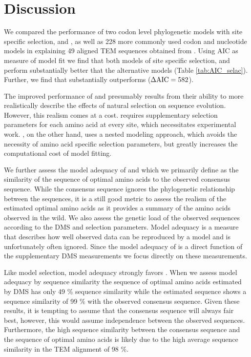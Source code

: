 \documentclass[12pt]{article}
\begin{document}
\section{Discussion}

We compared the performance of two codon level phylogenetic models with site specific selection, \phydms and \selac, as well as 228 more commonly used codon and nucleotide models in explaining 49 aligned TEM sequences obtained from \citet{bloom2017}.
Using AIC as measure of model fit we find that both models of site specific selection, \phydms and \selac perform substantially better that the alternative models (Table \ref{tab:AIC_selac}).
Further, we find that \selac substantially outperforms \phydms ($\Delta\text{AIC} = 582$).

The improved performance of \phydms and \selac presumably results from their ability to more realistically describe the effects of natural selection on sequence evolution.
However, this realism comes at a cost. 
\phydms requires supplementary selection parameters for each amino acid at every site, which necessitates experimental work.
\selac, on the other hand, uses a nested modeling approach, which avoids the necessity of amino acid specific selection parameters, but greatly increases the computational cost of model fitting.

We further assess the model adequacy of \phydms and \selac which we primarily define as the similarity of the sequence of optimal amino acids to the observed consensus sequence.
While the consensus sequence ignores the phylogenetic relationship between the sequences, it is a still good metric to assess the realism of the estimated optimal amino acids as it provides a summary of the amino acids observed in the wild.
We also assess the genetic load of the observed sequences according to the DMS and \selac selection parameters.
Model adequacy is a measure that describes how well observed data can be reproduced by a model and is unfortunately often ignored.
Since the model adequacy of \phydms is a direct function of the supplementary DMS measurements we focus directly on these measurements.

Like model selection, model adequacy strongly favors \selac.
When we assess model adequacy by sequence similarity the sequence of optimal amino acids estimated by DMS has only 49 \% sequence similarity while the \selac estimated sequence shows a sequence similarity of 99 \% with the observed consensus sequence.
Given these results, it is tempting to assume that the consensus sequence will always fair best, however, this would assume independence between the observed sequences.
Furthermore, the high sequence similarity between the consensus sequence and the sequence of optimal amino acids is likely due to the high average sequence similarity in the TEM alignment of 98 \%.
\end{document}
